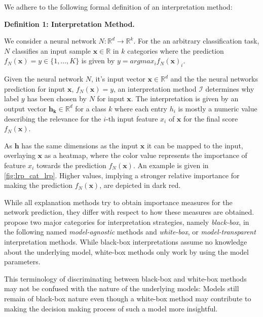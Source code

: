 \documentclass[sigconf]{acmart}
\begin{document}
We adhere to the following formal definition of an interpretation method:\newline

\textbf{Definition 1: Interpretation Method.}

\setlength{\leftskip}{0.39cm}

  \noindent We consider a neural network $N: \mathbb{R}^d \to \mathbb{R}^k$. For the an arbitrary classification task, $N$ classifies an input sample $\mathbf{x}\in \mathbb{R}$ in $k$ categories where the prediction $f_N(\mathbf{x})=y \in \{1, ..., K\}$ is given by $y = arg max_i f_N(\mathbf{x})_i$.

  Given the neural network $N$, it's input vector $\mathbf{x} \in \mathbb{R}^d$ and the the neural networks prediction for input $\mathbf{x}$, $f_N(\mathbf{x})=y$, an interpretation method $\mathcal{I}$ determines why label $y$ has been chosen by $N$ for input $\mathbf{x}$. 
  The interpretation is given by an output vector $\mathbf{h_k} \in \mathbb{R}^d$ for a class $k$ where each entry $h_i$ is mostly a numeric value describing the relevance for the $i$-th input feature $x_i$ of $\mathbf{x}$ for the final score $f_N(\mathbf{x})$.

\setlength{\leftskip}{0pt}
\par\smallskip\vspace{-0.1cm}

As $\mathbf{h}$ has the same dimensions as the input $\mathbf{x}$ it can be mapped to the input, overlaying $\mathbf{x}$ as a heatmap, where the color value represents the importance of feature $x_i$ towards the prediction $f_N(\mathbf{x})$.
An example is given in \autoref{fig:lrp_cat_lrp}. Higher values, implying a stronger relative importance for making the prediction $f_N(\mathbf{x})$, are depicted in dark red. 

While all explanation methods try to obtain importance measures for the network prediction, they differ with respect to how these measures are obtained. \cite{evaluating_explanations_security} propose two major categories for interpretation strategies, namely \textit{black-box}, in the following named \textit{model-agnostic} methods and \textit{white-box}, or \textit{model-transparent} interpretation methods. 
While black-box interpretations assume no knowledge about the underlying model, white-box methods only work by using the model parameters. 

This terminology of discriminating between black-box and white-box methods may not be confused with the nature of the underlying models: Models still remain of black-box nature even though a white-box method may contribute to making the decision making process of such a model more insightful.
\end{document}
